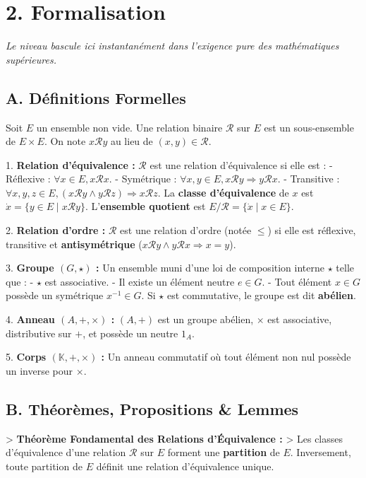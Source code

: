 \documentclass{report}
\begin{document}
\section*{2. Formalisation}
\textit{Le niveau bascule ici instantanément dans l'exigence pure des mathématiques supérieures.}

\subsection*{A. Définitions Formelles}
Soit $E$ un ensemble non vide. Une relation binaire $\mathcal{R}$ sur $E$ est un sous-ensemble de $E \times E$. On note $x \mathcal{R} y$ au lieu de $(x,y) \in \mathcal{R}$.

1. \textbf{Relation d'équivalence :} $\mathcal{R}$ est une relation d'équivalence si elle est :
   - Réflexive : $\forall x \in E, x \mathcal{R} x$.
   - Symétrique : $\forall x, y \in E, x \mathcal{R} y \Rightarrow y \mathcal{R} x$.
   - Transitive : $\forall x, y, z \in E, (x \mathcal{R} y \land y \mathcal{R} z) \Rightarrow x \mathcal{R} z$.
   La \textbf{classe d'équivalence} de $x$ est $\dot{x} = \{ y \in E \mid x \mathcal{R} y \}$. L'\textbf{ensemble quotient} est $E/\mathcal{R} = \{ \dot{x} \mid x \in E \}$.

2. \textbf{Relation d'ordre :} $\mathcal{R}$ est une relation d'ordre (notée $\le$) si elle est réflexive, transitive et \textbf{antisymétrique} ($x \mathcal{R} y \land y \mathcal{R} x \Rightarrow x = y$).

3. \textbf{Groupe $(G, \star)$ :} Un ensemble muni d'une loi de composition interne $\star$ telle que :
   - $\star$ est associative.
   - Il existe un élément neutre $e \in G$.
   - Tout élément $x \in G$ possède un symétrique $x^{-1} \in G$.
   Si $\star$ est commutative, le groupe est dit \textbf{abélien}.

4. \textbf{Anneau $(A, +, \times)$ :} $(A, +)$ est un groupe abélien, $\times$ est associative, distributive sur $+$, et possède un neutre $1_A$.

5. \textbf{Corps $(\mathbb{K}, +, \times)$ :} Un anneau commutatif où tout élément non nul possède un inverse pour $\times$.

\subsection*{B. Théorèmes, Propositions \& Lemmes}
> \textbf{Théorème Fondamental des Relations d'Équivalence :}
> Les classes d'équivalence d'une relation $\mathcal{R}$ sur $E$ forment une \textbf{partition} de $E$. Inversement, toute partition de $E$ définit une relation d'équivalence unique.
\end{document}
